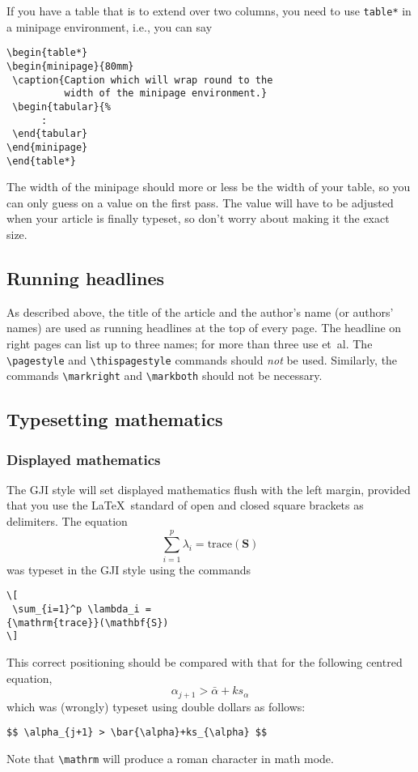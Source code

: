 If you have a table that is to extend over two columns, you need to use
\verb"table*" in a minipage environment, i.e., you can say
\begin{verbatim}
\begin{table*}
\begin{minipage}{80mm}
 \caption{Caption which will wrap round to the
          width of the minipage environment.}
 \begin{tabular}{%
      :
 \end{tabular}
\end{minipage}
\end{table*}
\end{verbatim}
The width of the minipage should more or less be the width of your table,
so you can only guess on a value on the first pass. The value will have to
be adjusted when your article is finally typeset, so don't worry
about making it the exact size.

\subsection{Running headlines}

As described above, the title of the article and the author's name (or
authors' names) are used as running headlines at the top of every page.
The headline on right pages can list up to three names; for more than
three use et~al. The \verb"\pagestyle" and \verb"\thispagestyle"
commands should {\em not\/} be used. Similarly, the commands
\verb"\markright" and \verb"\markboth" should not be necessary.

\subsection{Typesetting mathematics}

\subsubsection{Displayed mathematics}

The GJI style will set displayed mathematics flush with the left margin,
provided that you use the \LaTeX\ standard of open and closed square brackets
as delimiters. The equation
\[
 \sum_{i=1}^p \lambda_i =
{\mathrm{trace}}(\mathbf{S})
\]
was typeset in the GJI style using the commands
\begin{verbatim}
\[
 \sum_{i=1}^p \lambda_i =
{\mathrm{trace}}(\mathbf{S})
\]
\end{verbatim}
This correct positioning should be compared with that for the following centred
equation, \[ \alpha_{j+1} > \bar{\alpha}+ks_{\alpha} \]
which was (wrongly) typeset using double dollars as follows:
\begin{verbatim}
$$ \alpha_{j+1} > \bar{\alpha}+ks_{\alpha} $$
\end{verbatim}
Note that \verb"\mathrm" will produce a roman character in math mode.

